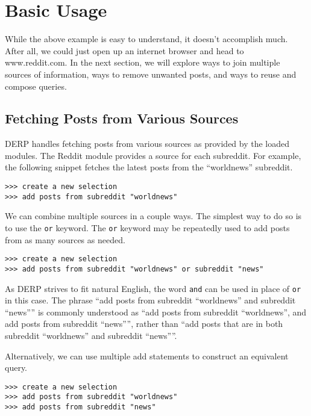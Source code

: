 \section{Basic Usage}
While the above example is easy to understand, it doesn’t accomplish much. After all, we could just open up an internet browser and head to www.reddit.com.
In the next section, we will explore ways to join multiple sources of information, ways to remove unwanted posts, and ways to reuse and compose queries.

\subsection{Fetching Posts from Various Sources}

DERP handles fetching posts from various sources as provided by the loaded modules. The Reddit module provides a source for each subreddit. For example,
the following snippet fetches the latest posts from the “worldnews” subreddit.
\newline\begin{minipage}{\linewidth}\begin{lstlisting}
>>> create a new selection
>>> add posts from subreddit "worldnews"
\end{lstlisting}\end{minipage}
We can combine multiple sources in a couple ways. The simplest way to do so is to use the \texttt{or} keyword. The \texttt{or} keyword may be repeatedly used to add posts
from as many sources as needed.
\newline\begin{minipage}{\linewidth}\begin{lstlisting}
>>> create a new selection
>>> add posts from subreddit "worldnews" or subreddit "news"
\end{lstlisting}\end{minipage}
As DERP strives to fit natural English, the word \texttt{and} can be used in place of \texttt{or} in this case. The phrase “add posts from subreddit “worldnews” and
subreddit “news”” is commonly understood as “add posts from subreddit “worldnews”, and add posts from subreddit “news””, rather than “add posts that
are in both subreddit “worldnews” and subreddit “news””.

Alternatively, we can use multiple add statements to construct an equivalent query.
\newline\begin{minipage}{\linewidth}\begin{lstlisting}
>>> create a new selection
>>> add posts from subreddit "worldnews"
>>> add posts from subreddit "news"
\end{lstlisting}\end{minipage}

